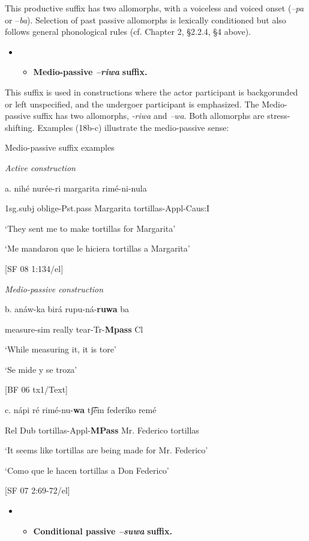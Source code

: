 This productive suffix has two allomorphs, with a voiceless and voiced onset (\textit{–pa} or –\textit{ba}). Selection of past passive allomorphs is lexically conditioned but also follows general phonological rules (cf. Chapter 2, §2.2.4, §4 above). 


\begin{itemize}
\item \begin{itemize}
\item \textbf{Medio-passive \textit{–riwa} }\textbf{suffix.}
\end{itemize}
\end{itemize}

This suffix is used in constructions where the actor participant is backgorunded or left unspecified, and the undergoer participant is emphasized. The Medio-passive suffix has two allomorphs, \textit{{}-riwa} and \textit{–wa}. Both allomorphs are stress-shifting. Examples (18b-c) illustrate the medio-passive sense: 

   Medio-passive suffix examples

  \textit{Active construction}

a.  nihé   nurée-ri     margarita   rimé-ni-nula

1sg.subj  oblige-Pst.pass  Margarita  tortillas-Appl-Caus:I

‘They sent me to make tortillas for Margarita’

‘Me mandaron que le hiciera tortillas a Margarita’  

[SF 08 1:134/el]

  \textit{Medio-passive construction}  

b.   anáw-ka   birá   rupu-ná-\textbf{ruwa}          ba

measure-sim  really   tear-Tr-\textbf{Mpass}   Cl

‘While measuring it, it is tore’

‘Se mide y se troza’          

[BF 06 tx1/Text]

c.   nápi  ré  rimé-nu-\textbf{wa}    tʃ͡ém  federíko   remé

Rel  Dub  tortillas-Appl-\textbf{MPass}  Mr.  Federico  tortillas

‘It seems like tortillas are being made for Mr. Federico’

  ‘Como que le hacen tortillas a Don Federico’  

  [SF 07 2:69-72/el]

\begin{itemize}
\item \begin{itemize}
\item \textbf{Conditional passive \textit{–suwa} }\textbf{suffix.}
\end{itemize}
\end{itemize}


